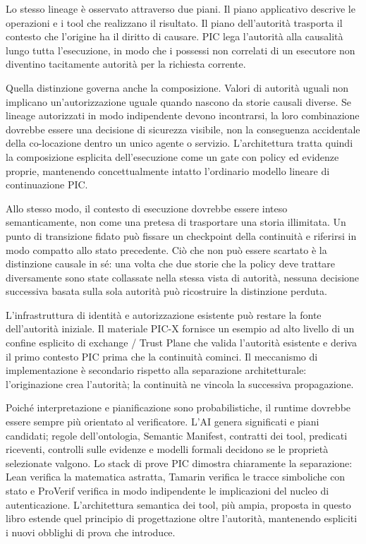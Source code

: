 \documentclass[10pt,oneside,openany]{book}
\begin{document}
Lo stesso lineage è osservato attraverso due piani. Il piano applicativo descrive le operazioni e i tool che realizzano il risultato. Il piano dell'autorità trasporta il contesto che l'origine ha il diritto di causare. PIC lega l'autorità alla causalità lungo tutta l'esecuzione, in modo che i possessi non correlati di un esecutore non diventino tacitamente autorità per la richiesta corrente.


Quella distinzione governa anche la composizione. Valori di autorità uguali non implicano un'autorizzazione uguale quando nascono da storie causali diverse. Se lineage autorizzati in modo indipendente devono incontrarsi, la loro combinazione dovrebbe essere una decisione di sicurezza visibile, non la conseguenza accidentale della co-locazione dentro un unico agente o servizio. L'architettura tratta quindi la composizione esplicita dell'esecuzione come un gate con policy ed evidenze proprie, mantenendo concettualmente intatto l'ordinario modello lineare di continuazione PIC.

Allo stesso modo, il contesto di esecuzione dovrebbe essere inteso semanticamente, non come una pretesa di trasportare una storia illimitata. Un punto di transizione fidato può fissare un checkpoint della continuità e riferirsi in modo compatto allo stato precedente. Ciò che non può essere scartato è la distinzione causale in sé: una volta che due storie che la policy deve trattare diversamente sono state collassate nella stessa vista di autorità, nessuna decisione successiva basata sulla sola autorità può ricostruire la distinzione perduta.


L'infrastruttura di identità e autorizzazione esistente può restare la fonte dell'autorità iniziale. Il materiale PIC-X fornisce un esempio ad alto livello di un confine esplicito di exchange / Trust Plane che valida l'autorità esistente e deriva il primo contesto PIC prima che la continuità cominci. Il meccanismo di implementazione è secondario rispetto alla separazione architetturale: l'originazione crea l'autorità; la continuità ne vincola la successiva propagazione.

Poiché interpretazione e pianificazione sono probabilistiche, il runtime dovrebbe essere sempre più orientato al verificatore. L'AI genera significati e piani candidati; regole dell'ontologia, Semantic Manifest, contratti dei tool, predicati riceventi, controlli sulle evidenze e modelli formali decidono se le proprietà selezionate valgono. Lo stack di prove PIC dimostra chiaramente la separazione: Lean verifica la matematica astratta, Tamarin verifica le tracce simboliche con stato e ProVerif verifica in modo indipendente le implicazioni del nucleo di autenticazione. L'architettura semantica dei tool, più ampia, proposta in questo libro estende quel principio di progettazione oltre l'autorità, mantenendo espliciti i nuovi obblighi di prova che introduce.
\end{document}
